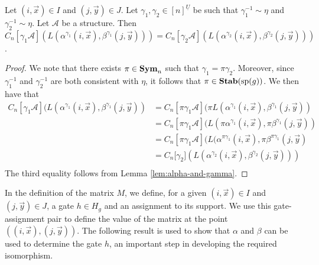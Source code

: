 \documentclass[../main/thesis.tex]{subfiles}
\begin{document}
\begin{lem}
	\label{lem:alpha-ind-gamma}
	Let $(i,\vec{x}) \in I$ and $(j, \vec{y}) \in J$. Let $\gamma_1, \gamma_2 \in
  [n]^{\underline{U}}$ be such that $\gamma^{-1}_1 \sim \eta$ and $\gamma^{-1}_2
  \sim \eta$. Let $\mathcal{A}$ be a structure. Then $C_n[\gamma_1 \mathcal{A}]
  (L(\alpha^{\gamma_1}(i, \vec{x}), \beta^{\gamma_1}(j, \vec{y}))) =
  C_n[\gamma_2 \mathcal{A}] (L(\alpha^{\gamma_2}(i, \vec{x}),
  \beta^{\gamma_2}(j, \vec{y})))$.
\end{lem}
\begin{proof}
	We note that there exists $\pi \in \text{\textbf{Sym}}_n$ such that $\gamma_1 = \pi
  \gamma_2$. Moreover, since $\gamma^{-1}_1$ and $\gamma^{-1}_2$ are both
  consistent with $\eta$, it follows that $\pi \in \text{\textbf{Stab}} (\text{sp} (g))$. We then have
  that
	\begin{align*}
		C_n[\gamma_1 \mathcal{A}](L(\alpha^{\gamma_1}(i, \vec{x}), \beta^{\gamma_1}(j,
		\vec{y})) & = C_n[\pi \gamma_1 \mathcal{A}](\pi L(\alpha^{\gamma_1}(i, \vec{x}), 
                \beta^{\gamma_1}(j, \vec{y})) \\
		          & = C_n[\pi \gamma_1 \mathcal{A}](L(\pi                                
                \alpha^{\gamma_1}(i, \vec{x}), \pi \beta^{\gamma_1}(j, \vec{y}))\\
		          & = C_n[\pi                                                            
                \gamma_1 \mathcal{A}](L(\alpha^{\pi \gamma_1}(i, \vec{x}), \pi \beta^{\pi
                \gamma_1}(j, \vec{y})\\
		          & = C_n[\gamma_2 \mathcal] (L(\alpha^{\gamma_2}(i,                     
                \vec{x}), \beta^{\gamma_2}(j, \vec{y})))\\
	\end{align*}The third equality follows from Lemma \ref{lem:alpha-and-gamma}.
\end{proof}

In the definition of the matrix $M$, we define, for a given $(i, \vec{x}) \in I$
and $(j, \vec{y}) \in J$, a gate $h \in H_g$ and an assignment to its support.
We use this gate-assignment pair to define the value of the matrix at the point
$((i, \vec{x}), (j, \vec{y}))$. The following result is used to show that
$\alpha$ and $\beta$ can be used to determine the gate $h$, an important step in
developing the required isomorphism.
\end{document}
